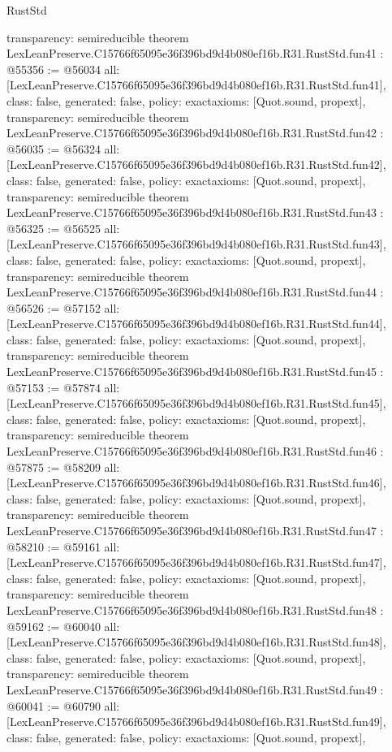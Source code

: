 \begin{lexlean}{RustStd}
\begin{coremodule}
{  transparency: semireducible
}
theorem LexLeanPreserve.C15766f65095e36f396bd9d4b080ef16b.R31.RustStd.fun41 : @55356 := @56034 {
  all: [LexLeanPreserve.C15766f65095e36f396bd9d4b080ef16b.R31.RustStd.fun41],
  class: false,
  generated: false,
  policy: exact{axioms: [Quot.sound, propext]},
  transparency: semireducible
}
theorem LexLeanPreserve.C15766f65095e36f396bd9d4b080ef16b.R31.RustStd.fun42 : @56035 := @56324 {
  all: [LexLeanPreserve.C15766f65095e36f396bd9d4b080ef16b.R31.RustStd.fun42],
  class: false,
  generated: false,
  policy: exact{axioms: [Quot.sound, propext]},
  transparency: semireducible
}
theorem LexLeanPreserve.C15766f65095e36f396bd9d4b080ef16b.R31.RustStd.fun43 : @56325 := @56525 {
  all: [LexLeanPreserve.C15766f65095e36f396bd9d4b080ef16b.R31.RustStd.fun43],
  class: false,
  generated: false,
  policy: exact{axioms: [Quot.sound, propext]},
  transparency: semireducible
}
theorem LexLeanPreserve.C15766f65095e36f396bd9d4b080ef16b.R31.RustStd.fun44 : @56526 := @57152 {
  all: [LexLeanPreserve.C15766f65095e36f396bd9d4b080ef16b.R31.RustStd.fun44],
  class: false,
  generated: false,
  policy: exact{axioms: [Quot.sound, propext]},
  transparency: semireducible
}
theorem LexLeanPreserve.C15766f65095e36f396bd9d4b080ef16b.R31.RustStd.fun45 : @57153 := @57874 {
  all: [LexLeanPreserve.C15766f65095e36f396bd9d4b080ef16b.R31.RustStd.fun45],
  class: false,
  generated: false,
  policy: exact{axioms: [Quot.sound, propext]},
  transparency: semireducible
}
theorem LexLeanPreserve.C15766f65095e36f396bd9d4b080ef16b.R31.RustStd.fun46 : @57875 := @58209 {
  all: [LexLeanPreserve.C15766f65095e36f396bd9d4b080ef16b.R31.RustStd.fun46],
  class: false,
  generated: false,
  policy: exact{axioms: [Quot.sound, propext]},
  transparency: semireducible
}
theorem LexLeanPreserve.C15766f65095e36f396bd9d4b080ef16b.R31.RustStd.fun47 : @58210 := @59161 {
  all: [LexLeanPreserve.C15766f65095e36f396bd9d4b080ef16b.R31.RustStd.fun47],
  class: false,
  generated: false,
  policy: exact{axioms: [Quot.sound, propext]},
  transparency: semireducible
}
theorem LexLeanPreserve.C15766f65095e36f396bd9d4b080ef16b.R31.RustStd.fun48 : @59162 := @60040 {
  all: [LexLeanPreserve.C15766f65095e36f396bd9d4b080ef16b.R31.RustStd.fun48],
  class: false,
  generated: false,
  policy: exact{axioms: [Quot.sound, propext]},
  transparency: semireducible
}
theorem LexLeanPreserve.C15766f65095e36f396bd9d4b080ef16b.R31.RustStd.fun49 : @60041 := @60790 {
  all: [LexLeanPreserve.C15766f65095e36f396bd9d4b080ef16b.R31.RustStd.fun49],
  class: false,
  generated: false,
  policy: exact{axioms: [Quot.sound, propext]},
}
\end{coremodule}
\end{lexlean}
